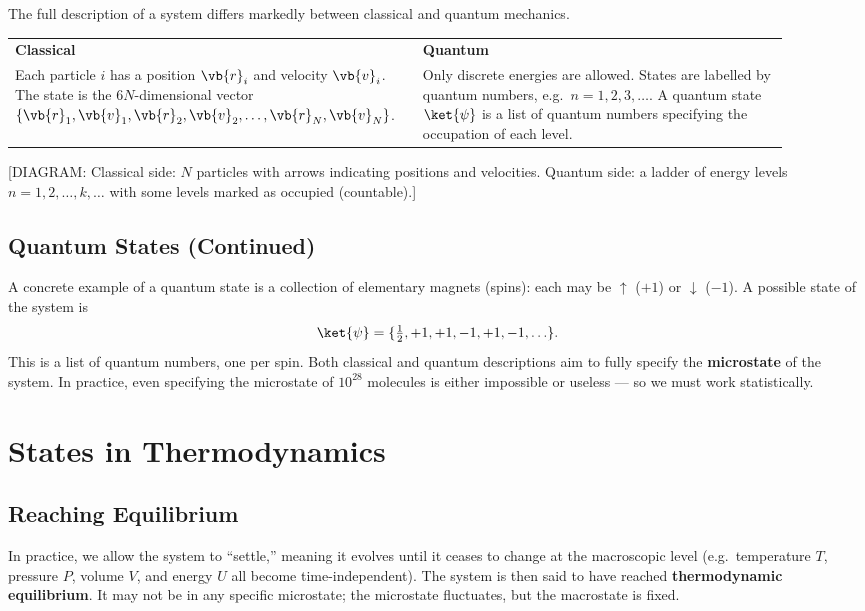 The full description of a system differs markedly between classical and quantum mechanics.

\begin{center}
\begin{tabular}{p{0.45\linewidth}|p{0.45\linewidth}}
  \textbf{Classical} & \textbf{Quantum} \\[4pt]
  Each particle $i$ has a position $\vb{r}_i$ and velocity $\vb{v}_i$. The state is the
  $6N$-dimensional vector $\{\vb{r}_1, \vb{v}_1, \vb{r}_2, \vb{v}_2, \ldots, \vb{r}_N, \vb{v}_N\}$.
  & Only discrete energies are allowed. States are labelled by quantum numbers, e.g.\
  $n = 1, 2, 3, \ldots$. A quantum state $\ket{\psi}$ is a list of quantum numbers specifying
  the occupation of each level.
\end{tabular}
\end{center}

\begin{center}
[DIAGRAM: Classical side: $N$ particles with arrows indicating positions and velocities.
Quantum side: a ladder of energy levels $n = 1, 2, \ldots, k, \ldots$ with some levels marked
as occupied (countable).]
\end{center}

\subsection{Quantum States (Continued)}

A concrete example of a quantum state is a collection of elementary magnets (spins): each may
be $\uparrow$ ($+1$) or $\downarrow$ ($-1$). A possible state of the system is
\[
  \ket{\psi} = \{\tfrac{1}{2}, +1, +1, -1, +1, -1, \ldots\}.
\]
This is a list of quantum numbers, one per spin. Both classical and quantum descriptions aim to
fully specify the \textbf{microstate} of the system. In practice, even specifying the microstate
of $10^{28}$ molecules is either impossible or useless --- so we must work statistically.

\section{States in Thermodynamics}

\subsection{Reaching Equilibrium}

In practice, we allow the system to ``settle,'' meaning it evolves until it ceases to change
at the macroscopic level (e.g.\ temperature $T$, pressure $P$, volume $V$, and energy $U$ all
become time-independent). The system is then said to have reached \textbf{thermodynamic
equilibrium}. It may not be in any specific microstate; the microstate fluctuates, but the
macrostate is fixed.

